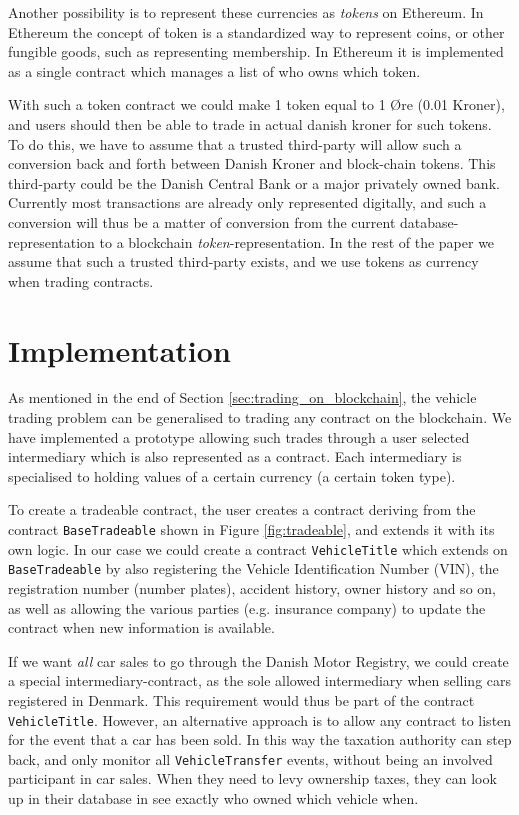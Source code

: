 \documentclass[oneside,a4paper,10pts,article]{memoir}
\begin{document}
Another possibility is to represent these currencies as
\textit{tokens} on Ethereum. In Ethereum the concept of token is a
standardized way to represent coins, or other fungible goods, such as
representing membership. In Ethereum it is implemented as a single
contract which manages a list of who owns which token.

With such a token contract we could make 1 token equal to 1 Øre (0.01
Kroner), and users should then be able to trade in actual danish
kroner for such tokens. To do this, we have to assume that a trusted
third-party will allow such a conversion back and forth between Danish
Kroner and block-chain tokens. This third-party could be the Danish
Central Bank or a major privately owned bank. Currently most
transactions are already only represented digitally, and such a
conversion will thus be a matter of conversion from the current
database-representation to a blockchain
\emph{token}-representation. In the rest of the paper we assume that
such a trusted third-party exists, and we use tokens as currency when
trading contracts.

\chapter{Implementation}
\label{sec:implementation}
As mentioned in the end of Section \ref{sec:trading_on_blockchain},
the vehicle trading problem can be generalised to trading any contract
on the blockchain. We have implemented a prototype allowing such
trades through a user selected intermediary which is also represented
as a contract. Each intermediary is specialised to holding values of a
certain currency (a certain token type).

To create a tradeable contract, the user creates a contract deriving
from the contract \texttt{BaseTradeable} shown in Figure
\ref{fig:tradeable}, and extends it with its own logic. In our case we
could create a contract \texttt{VehicleTitle} which extends on
\texttt{BaseTradeable} by also registering the Vehicle Identification
Number (VIN), the registration number (number plates), accident
history, owner history and so on, as well as allowing the various
parties (e.g. insurance company) to update the contract when new
information is available.

If we want \emph{all} car sales to go through the Danish Motor
Registry, we could create a special intermediary-contract, as the sole
allowed intermediary when selling cars registered in Denmark. This
requirement would thus be part of the contract
\texttt{VehicleTitle}. However, an alternative approach is to allow
any contract to listen for the event that a car has been sold. In this
way the taxation authority can step back, and only monitor all
\texttt{VehicleTransfer} events, without being an involved participant
in car sales. When they need to levy ownership taxes, they can look up
in their database in see exactly who owned which vehicle when.
\end{document}
